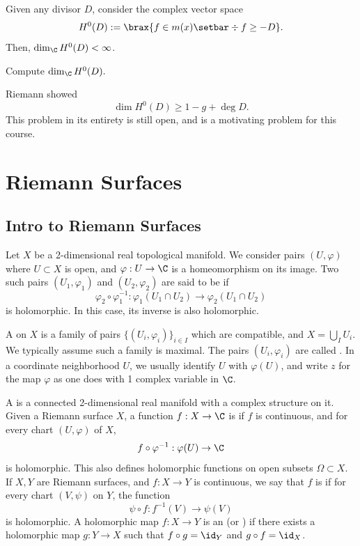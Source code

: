 \documentclass[11pt]{report}
\begin{document}
\begin{notethm*}
    Given any divisor $D$, consider the complex vector space 
    $$H^0(D) := \brax{ f \in m(x) \setbar \div f \geq -D }.$$
    Then, $\dim_\C H^0(D) < \infty$.
\end{notethm*}

\begin{notethm*}
    Compute $\dim_\C H^0(D).$
\end{notethm*}
Riemann showed
$$\dim H^0(D) \geq 1-g+\deg D.$$
This problem in its entirety is still open, and is a motivating problem for this course.

\chapter{Riemann Surfaces}

\section{Intro to Riemann Surfaces}

\begin{defn}
Let $X$ be a 2-dimensional real topological manifold. We consider pairs $(U,\varphi)$ where $U \subset X$ is open, and $\varphi:U\to \C$ is a homeomorphism on its image. Two such pairs $(U_1,\varphi_1)$ and $(U_2,\varphi_2)$ are said to be  if
$$\varphi_2 \circ \varphi_1^{-1} :\varphi_1(U_1\cap U_2) \to \varphi_2(U_1\cap U_2)$$
is holomorphic. In this case, its inverse is also holomorphic.

A  on $X$ is a family of pairs $\{(U_i,\varphi_i)\}_{i \in I}$ which are compatible, and $X = \bigcup _IU_i$. We typically assume such a family is maximal. The pairs $(U_i,\varphi_i)$ are called . In a coordinate neighborhood $U$, we usually identify $U$ with $\varphi(U)$, and write $z$ for the map $\varphi$ as one does with 1 complex variable in $\C$. 

A  is a connected 2-dimensional real manifold with a complex structure on it. Given a Riemann surface $X$, a function $f:X \to \C$ is  if $f$ is continuous, and for every chart $(U,\varphi)$ of $X$, 
$$f \circ \varphi^{-1}: \varphi(U) \to \C$$
is holomorphic. This also defines holomorphic functions on open subsets $\Omega \subset X$. 
If $X,Y$ are Riemann surfaces, and $f:X \to Y$ is continuous, we say that $f$ is  if for every chart $(V,\psi)$ on $Y$, the function 
$$\psi\circ f:f^{-1}(V)\to \psi(V)$$
is holomorphic. A holomorphic map $f:X \to Y$ is an  (or ) if there exists a holomorphic map $g:Y \to X$ such that $f\circ g =\id_Y$ and $g \circ f=\id_X$.
\end{defn}
\end{document}
